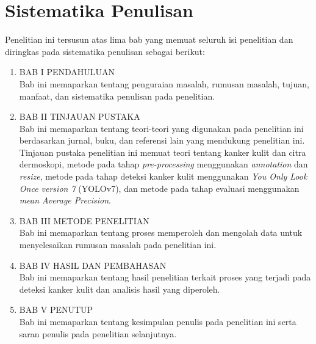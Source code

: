     \section{Sistematika Penulisan}
    Penelitian ini tersusun atas lima bab yang memuat seluruh isi penelitian dan diringkas pada sistematika penulisan sebagai berikut:
    \begin{enumerate}
        \item BAB I PENDAHULUAN\\
        Bab ini memaparkan tentang penguraian masalah, rumusan masalah, tujuan, manfaat, dan sistematika penulisan pada penelitian.
        \item BAB II TINJAUAN PUSTAKA\\
        Bab ini memaparkan tentang teori-teori yang digunakan pada penelitian ini berdasarkan jurnal, buku, dan referensi lain yang mendukung penelitian ini. Tinjauan pustaka penelitian ini memuat teori tentang kanker kulit dan citra dermoskopi, metode pada tahap \textit{pre-processing} menggunakan \textit{annotation} dan \textit{resize}, metode pada tahap deteksi kanker kulit menggunakan \textit{You Only Look Once version 7} (YOLOv7), dan metode pada tahap evaluasi menggunakan \textit{mean Average Precision}.
        \item BAB III METODE PENELITIAN\\
        Bab ini memaparkan tentang proses memperoleh dan mengolah data untuk menyelesaikan rumusan masalah pada penelitian ini.
        \item BAB IV HASIL DAN PEMBAHASAN\\
        Bab ini memaparkan tentang hasil penelitian terkait proses yang terjadi pada deteksi kanker kulit dan analisis hasil yang diperoleh.
        \item BAB V PENUTUP\\
        Bab ini memaparkan tentang kesimpulan penulis pada penelitian ini serta saran penulis pada penelitian selanjutnya.
    \end{enumerate}